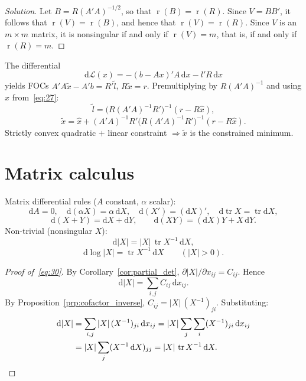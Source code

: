 \documentclass[14pt]{extarticle}
\theoremstyle{plain}
\theoremstyle{definition}
\theoremstyle{remark}
\newenvironment{solution}{%
  \begin{proof}[Solution]%
}{%
  \end{proof}%
}
\DeclareMathOperator{\tr}{tr}
\DeclareMathOperator{\rank}{r}
\newcommand{\dd}{\mathrm{d}}
\begin{document}
\begin{solution}
Let $B = R(A'A)^{-1/2}$, so that $\rank(B) = \rank(R)$. Since $V = BB'$, it follows that $\rank(V) = \rank(B)$, and hence that $\rank(V) = \rank(R)$. Since $V$ is an $m \times m$ matrix, it is nonsingular if and only if $\rank(V) = m$, that is, if and only if $\rank(R) = m$.
\end{solution}

The differential
\[
\dd\mathcal{L}(x) = -(b-Ax)'A\, \dd x - l'R\, \dd x
\]
yields FOCs $A'A\tilde{x} - A'b = R'\tilde{l}$, $R\tilde{x} = r$. Premultiplying by $R(A'A)^{-1}$ and using $\hat{x}$ from~\eqref{eq:27}:
\[
\tilde{l} = \bigl(R(A'A)^{-1}R'\bigr)^{-1}(r - R\hat{x}),
\]
\begin{equation}\label{eq:29}
\tilde{x} = \hat{x} + (A'A)^{-1}R'\bigl(R(A'A)^{-1}R'\bigr)^{-1}(r - R\hat{x}).
\end{equation}
Strictly convex quadratic $+$ linear constraint $\Rightarrow \tilde{x}$ is the constrained minimum.

\section{Matrix calculus}\label{sec:7}

Matrix differential rules ($A$ constant, $\alpha$ scalar):
\[
\dd A = 0, \quad \dd(\alpha X) = \alpha\, \dd X, \quad \dd(X') = (\dd X)', \quad \dd\tr X = \tr \dd X,
\]
\[
\dd(X + Y) = \dd X + \dd Y, \qquad \dd(XY) = (\dd X)Y + X\, \dd Y.
\]
Non-trivial (nonsingular $X$):
\begin{equation}\label{eq:30}
\dd|X| = |X|\, \tr X^{-1}\, \dd X,
\end{equation}
\begin{equation}\label{eq:31}
\dd\log|X| = \tr X^{-1}\, \dd X \qquad (|X| > 0).
\end{equation}

\begin{proof}[Proof of~\eqref{eq:30}]
By Corollary~\ref{cor:partial_det}, $\partial|X|/\partial x_{ij} = C_{ij}$. Hence
\[
\dd|X| = \sum_{i,j} C_{ij}\, \dd x_{ij}.
\]
By Proposition~\ref{prp:cofactor_inverse}, $C_{ij} = |X|\, (X^{-1})_{ji}$. Substituting:
\begin{align*}
\dd|X| &= \sum_{i,j} |X|\, (X^{-1})_{ji}\, \dd x_{ij}
= |X| \sum_{j} \sum_{i} (X^{-1})_{ji}\, \dd x_{ij} \\
&= |X| \sum_{j} (X^{-1}\, \dd X)_{jj}
= |X|\, \tr X^{-1}\, \dd X. \qedhere
\end{align*}
\end{proof}
\end{document}
